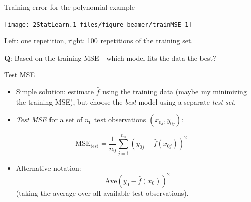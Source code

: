 \documentclass[
  ignorenonframetext,
]{beamer}
\providecommand{\tightlist}{%
  \setlength{\itemsep}{0pt}\setlength{\parskip}{0pt}}
\begin{document}
\begin{frame}
\begin{block}{Training error for the polynomial example}
\protect\hypertarget{training-error-for-the-polynomial-example}{}
\(~\)

\begin{center}\texttt{[image: 2StatLearn.1\_files/figure-beamer/trainMSE-1]} \end{center}

\vspace{2mm}

Left: one repetition, right: 100 repetitions of the training set.

\vspace{2mm}

\textbf{Q}: Based on the training MSE - which model fits the data the
best?
\end{block}
\end{frame}

\begin{frame}
\begin{block}{Test MSE}
\protect\hypertarget{test-mse}{}
\(~\)

\begin{itemize}
\tightlist
\item
  Simple solution: estimate \(\hat{f}\) using the training data (maybe
  my minimizing the training MSE), but choose the \emph{best} model
  using a separate \emph{test set}.
\end{itemize}

\vspace{2mm}

\begin{itemize}
\tightlist
\item
  \emph{Test MSE} for a set of \(n_0\) test observations
  \((x_{0j},y_{0j})\):
\end{itemize}

\[ \text{MSE}_{\text{test}}=\frac{1}{n_0}\sum_{j=1}^{n_0} (y_{0j}-\hat{f}(x_{0j}))^2\]

\vspace{2mm}

\begin{itemize}
\tightlist
\item
  Alternative notation: \[\text{Ave}(y_0-\hat{f}(x_0))^2\] (taking the
  average over all available test observations).
\end{itemize}
\end{block}
\end{frame}
\end{document}
